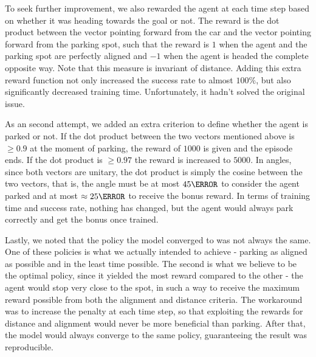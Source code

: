 To seek further improvement, we also rewarded the agent at each time step based on whether it was heading towards the goal or not. The reward is the dot product between the vector pointing forward from the car and the vector pointing forward from the parking spot, such that the reward is $1$ when the agent and the parking spot are perfectly aligned and $-1$ when the agent is headed the complete opposite way. Note that this measure is invariant of distance. Adding this extra reward function not only increased the success rate to almost $100\%$, but also significantly decreased training time. Unfortunately, it hadn't solved the original issue.

As an second attempt, we added an extra criterion to define whether the agent is parked or not. If the dot product between the two vectors mentioned above is $\geq 0.9$ at the moment of parking, the reward of $1000$ is given and the episode ends. If the dot product is $\geq 0.97$ the reward is increased to $5000$. In angles, since both vectors are unitary, the dot product is simply the cosine between the two vectors, that is, the angle must be at most $45\degree$ to consider the agent parked and at most $\approx 25\degree$ to receive the bonus reward. In terms of training time and success rate, nothing has changed, but the agent would always park correctly and get the bonus once trained.

Lastly, we noted that the policy the model converged to was not always the same. One of these policies is what we actually intended to achieve - parking as aligned as possible and in the least time possible. The second is what we believe to be the optimal policy, since it yielded the most reward compared to the other - the agent would stop very close to the spot, in such a way to receive the maximum reward possible from both the alignment and distance criteria. The workaround was to increase the penalty at each time step, so that exploiting the rewards for distance and alignment would never be more beneficial than parking. After that, the model would always converge to the same policy, guaranteeing the result was reproducible.

